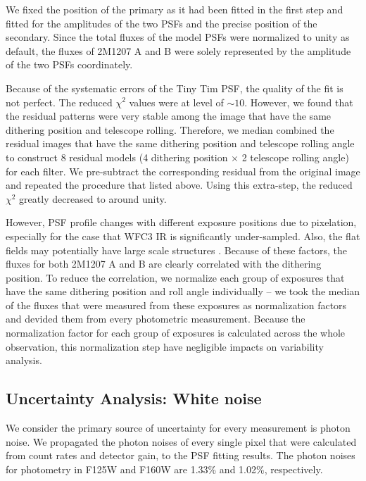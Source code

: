 \documentclass[apj]{emulateapj}
\begin{document}
We fixed the position of the primary as it had been fitted in the first step and fitted for the
amplitudes of the two PSFs and the precise position of the
secondary. Since the total fluxes of the model PSFs were normalized to
unity as default, the fluxes of 2M1207 A and B were solely represented
by the amplitude of the two PSFs coordinately.

Because of the systematic errors of the Tiny Tim PSF, the quality of the
fit is not perfect. The reduced $\chi^{2}$ values were at level
of $\sim10$. However, we found that the residual patterns were very
stable among the image that have the same dithering position and
telescope rolling. Therefore, we median combined the residual images
that have the same dithering position and telescope rolling angle to
construct 8 residual models (4 dithering position $\times$ 2 telescope
rolling angle) for each filter. We pre-subtract the corresponding
residual from the original image and repeated the procedure that
listed above. Using this extra-step, the reduced $\chi^{2}$
greatly decreased to around unity.

However, PSF profile changes with different exposure positions due to
pixelation, especially for the case that WFC3 IR is significantly
under-sampled. Also, the flat fields may potentially have large scale
structures \citep{dressel2012wide}. Because of these factors, the
fluxes for both 2M1207 A and B are clearly correlated with the
dithering position. To reduce the correlation, we normalize each group of exposures
that have the same dithering position and roll angle individually --
we took the median of the fluxes that were measured from these
exposures as normalization factors and devided them from every photometric
measurement. Because the normalization factor for each group of
exposures is calculated across the whole observation, this
normalization step have negligible impacts on variability analysis.



\subsection{Uncertainty Analysis: White noise}
We consider the primary source of uncertainty for every measurement is
photon noise. We propagated the photon noises of every single pixel
that were calculated from count rates and detector gain, to the PSF
fitting results. The photon noises for photometry in F125W and F160W
are 1.33\% and 1.02\%, respectively.
\end{document}
